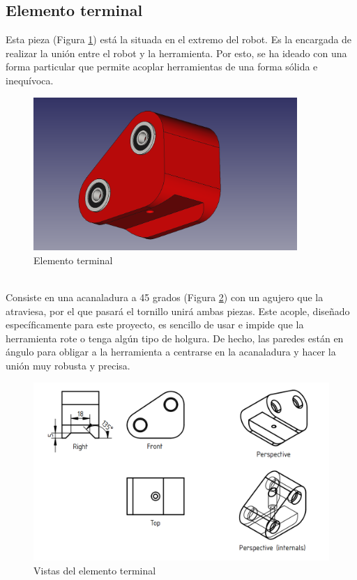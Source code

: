 \subsection{Elemento terminal}
\noindent Esta pieza (Figura \ref{fig:extremo_pieza}) está la situada en el extremo del robot. Es la encargada de realizar la unión entre el robot y la herramienta. Por esto, 
se ha ideado con una forma particular que permite acoplar herramientas de una forma sólida e inequívoca. 
\begin{figure} [ht!]
  \begin{center}
    \includegraphics[width=10cm]{figs/extremo_robot.png}
  \end{center}
  \caption{Elemento terminal}
  \label{fig:extremo_pieza}
\end{figure}\ 
\\
\indent Consiste en una acanaladura a 45 grados (Figura \ref{fig:vistas_extremo}) con un agujero que la atraviesa, por el que pasará el tornillo unirá ambas piezas. 
Este acople, diseñado específicamente para este proyecto, es sencillo de usar e impide que la herramienta rote o 
tenga algún tipo de holgura. De hecho, las paredes están en ángulo para obligar a la herramienta a centrarse en la acanaladura y hacer 
la unión muy robusta y precisa.
\begin{figure} [ht!]
  \begin{center}
    \includegraphics[width=14cm]{figs/vistas_extremo.png}
  \end{center}
  \caption{Vistas del elemento terminal}
  \label{fig:vistas_extremo}
\end{figure}\ 

